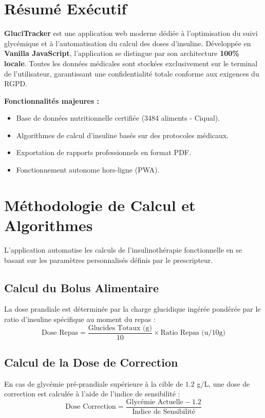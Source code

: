\documentclass[11pt, a4paper]{report}
\begin{document}
\newpage
{}

\section*{Résumé Exécutif}
\textbf{GluciTracker} est une application web moderne dédiée à l'optimisation du suivi glycémique et à l'automatisation du calcul des doses d'insuline. Développée en \textbf{Vanilla JavaScript}, l'application se distingue par son architecture \textbf{100\% locale}. Toutes les données médicales sont stockées exclusivement sur le terminal de l'utilisateur, garantissant une confidentialité totale conforme aux exigences du RGPD.

\textbf{Fonctionnalités majeures :}
\begin{itemize}
    \item Base de données nutritionnelle certifiée (3484 aliments - Ciqual).
    \item Algorithmes de calcul d'insuline basés sur des protocoles médicaux.
    \item Exportation de rapports professionnels en format PDF.
    \item Fonctionnement autonome hors-ligne (PWA).
\end{itemize}

\newpage

\section{Méthodologie de Calcul et Algorithmes}

L'application automatise les calculs de l'insulinothérapie fonctionnelle en se basant sur les paramètres personnalisés définis par le prescripteur.

\subsection{Calcul du Bolus Alimentaire}
La dose prandiale est déterminée par la charge glucidique ingérée pondérée par le ratio d'insuline spécifique au moment du repas :
\[ \text{Dose Repas} = \frac{\text{Glucides Totaux (g)}}{10} \times \text{Ratio Repas (u/10g)} \]

\subsection{Calcul de la Dose de Correction}
En cas de glycémie pré-prandiale supérieure à la cible de $1.2$ g/L, une dose de correction est calculée à l'aide de l'indice de sensibilité :
\[ \text{Dose Correction} = \frac{\text{Glycémie Actuelle} - 1.2}{\text{Indice de Sensibilité}} \]
\end{document}
